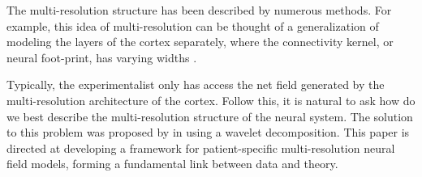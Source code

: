 \documentclass[review,authoryear,3p]{elsarticle}
\begin{document}
The multi-resolution structure has been described by numerous methods. For example, this idea of multi-resolution can be thought of a generalization of modeling the layers of the cortex separately, where the connectivity kernel, or neural foot-print, has varying widths \citep{Wilson1973}.

Typically, the experimentalist only has access the net field generated by the multi-resolution architecture of the cortex. Follow this, it is natural to ask how do we best describe the multi-resolution structure of the neural system. The solution to this problem was proposed by \citet{Breakspear2005} in using a wavelet decomposition. This paper is directed at developing a framework for patient-specific multi-resolution neural field models, forming a fundamental link between data and theory. 
\end{document}
